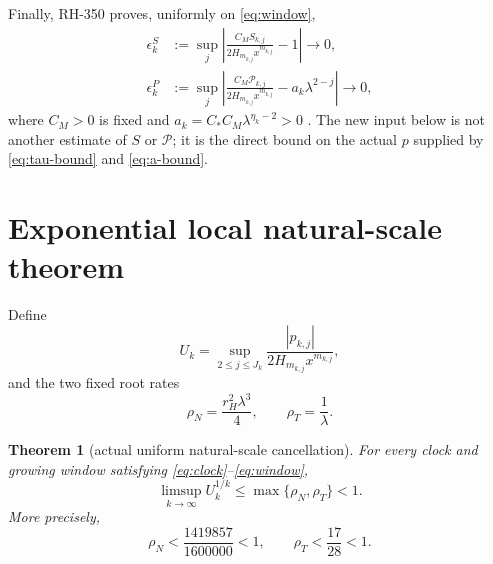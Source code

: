 \documentclass[11pt]{article}
\newtheorem{theorem}{Theorem}[section]
\theoremstyle{remark}
\newcommand{\cP}{\mathcal P}
\begin{document}
Finally, RH-350 proves, uniformly on \eqref{eq:window},
\begin{align}
 \epsilon_k^S&:=
 \sup_j\left|
 \frac{C_MS_{k,j}}{2H_{m_{k,j}}x^{m_{k,j}}}-1
 \right|\longrightarrow0,
 \label{eq:S-uniform}\\
 \epsilon_k^P&:=
 \sup_j\left|
 \frac{C_M\cP_{k,j}}{2H_{m_{k,j}}x^{m_{k,j}}}
 -a_k\lambda^{2-j}
 \right|\longrightarrow0,
 \label{eq:P-uniform}
\end{align}
where $C_M>0$ is fixed and
$a_k=C_*C_M\lambda^{\eta_k-2}>0$
\citep{WangGrowingSidebands2026}.  The new input below is not another
estimate of $S$ or $\cP$; it is the direct bound on the actual $p$ supplied
by \eqref{eq:tau-bound} and \eqref{eq:a-bound}.

\section{Exponential local natural-scale theorem}

Define
\begin{equation}\label{eq:U}
 U_k=\sup_{2\le j\le J_k}
 \frac{|p_{k,j}|}{2H_{m_{k,j}}x^{m_{k,j}}},
\end{equation}
and the two fixed root rates
\begin{equation}\label{eq:rates}
 \rho_N=\frac{r_H^2\lambda^3}{4},
 \qquad \rho_T=\frac1\lambda.
\end{equation}

\begin{theorem}[actual uniform natural-scale cancellation]
\label{thm:uniform-cap}
For every clock and growing window satisfying
\eqref{eq:clock}--\eqref{eq:window},
\begin{equation}\label{eq:U-rate}
 \boxed{
 \limsup_{k\to\infty}U_k^{1/k}
 \le\max\{\rho_N,\rho_T\}<1.}
\end{equation}
More precisely,
\begin{equation}\label{eq:rate-certificates}
 \rho_N<\frac{1419857}{1600000}<1,
 \qquad
 \rho_T<\frac{17}{28}<1.
\end{equation}
\end{theorem}
\end{document}
